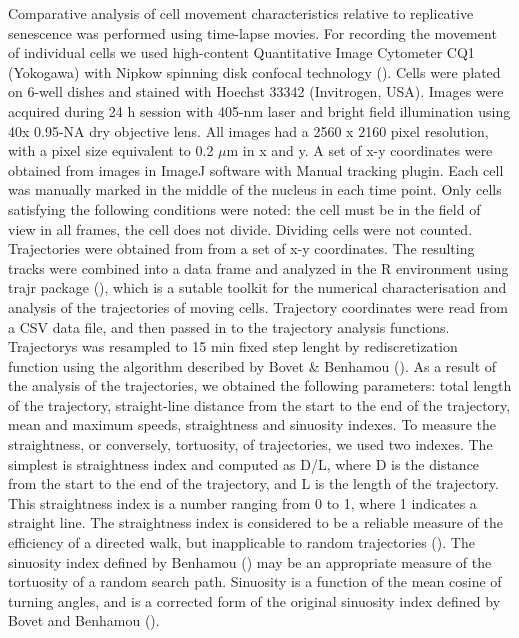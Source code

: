 \documentclass[alpha-refs]{wiley-article}
\begin{document}
Comparative analysis of cell movement characteristics relative to replicative senescence was performed using time-lapse movies.
For recording the movement of individual cells we used high-content Quantitative Image Cytometer CQ1 (Yokogawa) with Nipkow spinning disk confocal technology (\cite{sakashita2015cq1}).
Cells were plated on 6-well dishes and stained with Hoechst 33342 (Invitrogen, USA).
Images were acquired during 24 h session with 405-nm laser and bright field illumination using 40x 0.95-NA dry objective lens.
All images had a 2560 x 2160 pixel resolution, with a pixel size equivalent to 0.2 $\mu$m in x and y.
A set of x-y coordinates were obtained from images in ImageJ software with Manual tracking plugin.
Each cell was manually marked in the middle of the nucleus in each time point.
Only cells satisfying the following conditions were noted: the cell must be in the field of view in all frames, the cell does not divide.
Dividing cells were not counted.
Trajectories were obtained from from a set of x-y coordinates.
The resulting tracks were combined into a data frame and analyzed in the R environment using trajr package (\cite{mclean2018trajr}), which is a sutable toolkit for the numerical characterisation and analysis of the trajectories of moving cells.
Trajectory coordinates were read from a CSV data file, and then passed in to the trajectory analysis functions.
Trajectorys was resampled to 15 min fixed step lenght by rediscretization function using the algorithm described by Bovet \& Benhamou (\cite{bovet1988spatial}).
As a result of the analysis of the trajectories, we obtained the following parameters: total length of the trajectory, straight-line distance from the start to the end of the trajectory, mean and maximum speeds, straightness and sinuosity indexes.
To measure the straightness, or conversely, tortuosity, of trajectories, we used two indexes.
The simplest is straightness index and computed as D/L, where D is the distance from the start to the end of the trajectory, and L is the length of the trajectory.
This straightness index is a number ranging from 0 to 1, where 1 indicates a straight line.
The straightness index is considered to be a reliable measure of the efficiency of a directed walk, but inapplicable to random trajectories (\cite{benhamou2006detecting}).
The sinuosity index defined by Benhamou (\cite{benhamou2004reliably}) may be an appropriate measure of the tortuosity of a random search path.
Sinuosity is a function of the mean cosine of turning angles, and is a corrected form of the original sinuosity index defined by Bovet and Benhamou (\cite{bovet1988spatial}).
\end{document}
